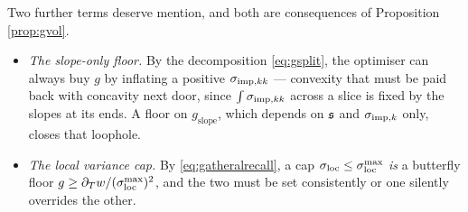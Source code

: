 
Two further terms deserve mention, and both are consequences of Proposition \ref{prop:gvol}.

\begin{itemize}
\item[i)] \emph{The slope-only floor.} By the decomposition \eqref{eq:gsplit}, the optimiser can
always buy $g$ by inflating a positive $\sigma_{\mathrm{imp},kk}$ --- convexity that must be paid back with
concavity next door, since $\int\sigma_{\mathrm{imp},kk}$ across a slice is fixed by the slopes at its ends. A floor
on $g_{\mathrm{slope}}$, which depends on $\mathfrak{s}$ and $\sigma_{\mathrm{imp},k}$ only, closes that loophole.


\item[ii)] \emph{The local variance cap.} By \eqref{eq:gatheralrecall}, a cap $\sigma_{\mathrm{loc}}\le\sigma_{\mathrm{loc}}^{\max}$
\emph{is} a butterfly floor $g\ge\partial_{T}w/(\sigma_{\mathrm{loc}}^{\max})^{2}$, and the two must be set
consistently or one silently overrides the other. 

\end{itemize}




